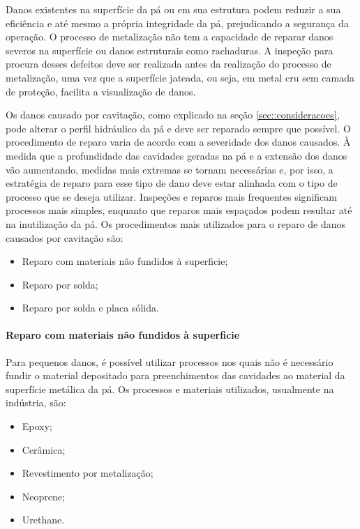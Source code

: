Danos existentes na superfície da pá ou em sua estrutura podem reduzir a sua
eficiência e até mesmo a própria integridade da pá, prejudicando a segurança 
da operação. O processo de metalização não tem a capacidade de reparar
danos severos na superfície ou danos estruturais como rachaduras. A inspeção
para procura desses defeitos deve ser realizada antes da realização do processo
de metalização, uma vez que a superfície jateada, ou seja, em metal cru sem
camada de proteção, facilita a visualização de danos. %

Os danos causado por cavitação, como explicado na seção
\ref{sec::consideracoes}, pode alterar o perfil hidráulico da pá e deve ser
reparado sempre que possível. O procedimento de reparo varia de acordo com a
severidade dos danos causados. À medida que a profundidade das cavidades geradas
na pá e a extensão dos danos vão aumentando, medidas mais extremas se tornam
necessárias e, por isso, a estratégia de reparo para esse tipo de dano deve
estar alinhada com o tipo de processo que se deseja utilizar. Inspeções e
reparos mais frequentes significam processos mais simples, enquanto que reparos
mais espaçados podem resultar até na inutilização da pá. Os procedimentos mais
utilizados para o reparo de danos causados por cavitação são:

\begin{itemize}
  \item Reparo com materiais não fundidos à superficie;
  \item Reparo por solda;
  \item Reparo por solda e placa sólida.
\end{itemize}

\paragraph{Reparo com materiais não fundidos à superficie}
Para pequenos danos, é possível utilizar processos nos quais não é necessário
fundir o material depositado para preenchimentos das cavidades ao material da
superfície metálica da pá. Os processos e materiais utilizados, usualmente na
indústria, são: 

\begin{itemize}
\item Epoxy;
\item Cerâmica;
\item Revestimento por metalização;
\item Neoprene;
\item Urethane.
\end{itemize}

